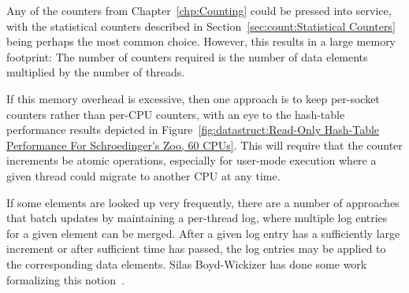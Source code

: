 Any of the counters from
Chapter~\ref{chp:Counting}
could be pressed into service, with the statistical counters described in
Section~\ref{sec:count:Statistical Counters}
being perhaps the most common choice.
However, this results in a large memory footprint: The number of counters
required is the number of data elements multiplied by the number of
threads.

If this memory overhead is excessive, then one approach is to keep
per-socket counters rather than per-CPU counters,
with an eye to the hash-table performance results depicted in
Figure~\ref{fig:datastruct:Read-Only Hash-Table Performance For Schroedinger's Zoo, 60 CPUs}.
This will require that the counter increments be atomic operations,
especially for user-mode execution where a given thread could migrate
to another CPU at any time.

If some elements are looked up very frequently, there are a number
of approaches that batch updates by maintaining a per-thread log,
where multiple log entries for a given element can be merged.
After a given log entry has a sufficiently large increment or after
sufficient time has passed, the log entries may be applied to the
corresponding data elements.
Silas Boyd-Wickizer has done some work formalizing this
notion~\cite{SilasBoydWickizerPhD}.
\fi
